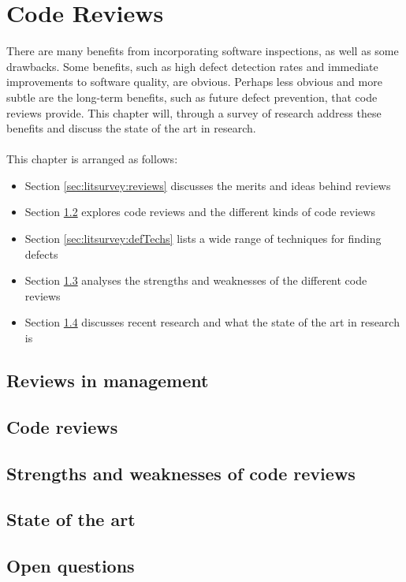 \chapter{Code Reviews} \label{chapter:litsurvey}

There are many benefits from incorporating software inspections, as well as
some drawbacks.
Some benefits, such as high defect detection rates and immediate improvements to software quality, are
obvious.
Perhaps less obvious and more subtle are the long-term benefits, such as future
defect prevention, that code reviews provide.
This chapter will, through a survey of research address these benefits and discuss the state of the
art in research.\\
\\
This chapter is arranged as follows:
\begin{itemize}
	\item Section \ref{sec:litsurvey:reviews} discusses the merits and ideas behind reviews
	\item Section \ref{sec:litsurvey:codeRev} explores code reviews and the different kinds of code
		reviews
	\item Section \ref{sec:litsurvey:defTechs} lists a wide range of techniques for finding defects
	\item Section \ref{sec:litsurvey:strWeak} analyses the strengths and weaknesses of the different
		code reviews
	\item Section \ref{sec:litsurvey:current} discusses recent research and what the state of the art
		in research is
\end{itemize}

\section{Reviews in management} \label{sec:defects:reviews}

\section{Code reviews} \label{sec:litsurvey:codeRev}

\section{Strengths and weaknesses of code reviews} \label{sec:litsurvey:strWeak}

\section{State of the art} \label{sec:litsurvey:current}

\section{Open questions}
